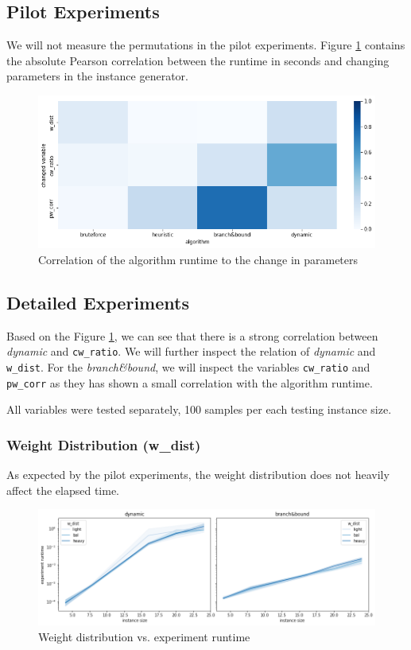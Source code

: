 \documentclass[a4paper,10pt]{article}
\begin{document}
\subsection{Pilot Experiments}

 We will not measure the permutations in the pilot experiments. Figure \ref{pilot_figure} contains the absolute Pearson correlation between the runtime in seconds and changing parameters in the instance generator.

\begin{figure}[!htb]
	\centering
  	\includegraphics[width=\textwidth]{images/pilot.png}
	\caption{Correlation of the algorithm runtime to the change in parameters}
	\label{pilot_figure}
\end{figure}

\subsection{Detailed Experiments}

Based on the Figure \ref{pilot_figure}, we can see that there is a strong correlation between \emph{dynamic} and \lstinline{cw_ratio}. We will further inspect the relation of \emph{dynamic} and \lstinline{w_dist}. For the \emph{branch\&bound}, we will inspect the variables \lstinline{cw_ratio} and \lstinline{pw_corr} as they has shown a small correlation with the algorithm runtime.

All variables were tested separately, 100 samples per each testing instance size.

\subsubsection{Weight Distribution (w\_dist)}

As expected by the pilot experiments, the weight distribution does not heavily affect the elapsed time.

\begin{figure}[!htb]
	\centering
  	\includegraphics[width=\textwidth]{images/wdist.png}
	\caption{Weight distribution vs. experiment runtime}
	\label{wdist}
\end{figure}
\end{document}

